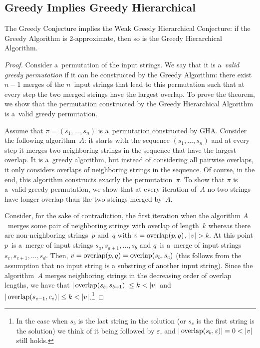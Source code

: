 \subsection{Greedy Implies Greedy Hierarchical}
\label{sec:gr_im_wghc}
\begin{theorem}
\label{thm:gr_im_wghc}
The Greedy Conjecture implies the Weak Greedy Hierarchical Conjecture: if the Greedy Algorithm is 2-approximate, then so is the Greedy Hierarchical Algorithm.
\end{theorem}
\begin{proof}
Consider a~permutation of the input strings. We say that it is a~{\em valid greedy permutation} if it can be constructed by the Greedy Algorithm: there exist $n-1$ merges of the $n$~input strings that lead to this permutation such that at every step the two merged strings have the largest overlap. To prove the theorem, we show that the permutation constructed by the Greedy Hierarchical Algorithm is a~valid greedy permutation.

Assume that $\pi=(s_1, \dots, s_n)$ is a~permutation constructed by GHA. Consider the following algorithm~$A$: it starts with the sequence $(s_1, \dots, s_n)$ and at every step it merges two neighboring strings in the sequence that have the largest overlap. It is a~greedy algorithm, but instead of considering all pairwise overlaps, it only considers overlaps of neighboring strings in the sequence. Of course, in the end, this algorithm constructs exactly the permutation~$\pi$. To show that $\pi$ is a~valid greedy permutation, we show that at every iteration of~$A$ no two strings have longer overlap than the two strings merged by~$A$.

Consider, for the sake of contradiction, the first iteration when the algorithm $A$~merges some pair of neighboring strings with overlap of length~$k$ whereas there are non-neighboring strings~$p$ and~$q$ with $v=\operatorname{overlap}(p,q)$, $|v|>k$. 
At this point $p$~is a~merge of input strings $s_a, s_{a+1}, \dotsc, s_b$
and $q$~is a~merge of input strings $s_c, s_{c+1}, \dotsc, s_d$. 
Then, $v=\operatorname{overlap}(p,q)=\operatorname{overlap}(s_b,s_c)$ (this follows from the assumption that no input string is a substring of another input string). Since the algorithm~$A$
merges neighboring strings in the decreasing order of overlap lengths, we have that $|\overlap(s_b,s_{b+1})| \le k <|v|$ and $|\operatorname{overlap}(s_{c-1},c_c)| \le k < |v|$.\footnote{In the case when $s_b$ is the last string in the solution (or $s_c$ is the first string is the solution) we think of it being followed by $\varepsilon$, and $|\overlap(s_b,\varepsilon)|=0<|v|$ still holds.} 


\end{proof}
